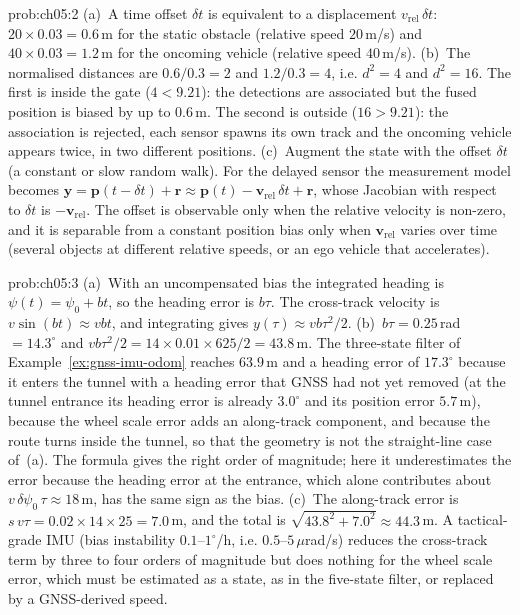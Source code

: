 \documentclass[graybox,envcountchap]{style/SNmono}
\begin{document}
\begin{sol}{prob:ch05:2}
(a)~A time offset $\delta t$ is equivalent to a displacement $v_{\mathrm{rel}}\,\delta t$: $20\times0.03=0.6$\,m for the static obstacle (relative speed $20$\,m/s) and $40\times0.03=1.2$\,m for the oncoming vehicle (relative speed $40$\,m/s). (b)~The normalised distances are $0.6/0.3=2$ and $1.2/0.3=4$, i.e. $d^{2}=4$ and $d^{2}=16$. The first is inside the gate ($4<9.21$): the detections are associated but the fused position is biased by up to $0.6$\,m. The second is outside ($16>9.21$): the association is rejected, each sensor spawns its own track and the oncoming vehicle appears twice, in two different positions. (c)~Augment the state with the offset $\delta t$ (a constant or slow random walk). For the delayed sensor the measurement model becomes $\mathbf{y}=\mathbf{p}(t-\delta t)+\mathbf{r}\approx\mathbf{p}(t)-\mathbf{v}_{\mathrm{rel}}\,\delta t+\mathbf{r}$, whose Jacobian with respect to $\delta t$ is $-\mathbf{v}_{\mathrm{rel}}$. The offset is observable only when the relative velocity is non-zero, and it is separable from a constant position bias only when $\mathbf{v}_{\mathrm{rel}}$ varies over time (several objects at different relative speeds, or an ego vehicle that accelerates).
\end{sol}

\begin{sol}{prob:ch05:3}
(a)~With an uncompensated bias the integrated heading is $\psi(t)=\psi_{0}+bt$, so the heading error is $b\tau$. The cross-track velocity is $v\sin(bt)\approx vbt$, and integrating gives $y(\tau)\approx vb\tau^{2}/2$. (b)~$b\tau=0.25$\,rad $=14.3^{\circ}$ and $vb\tau^{2}/2=14\times0.01\times625/2=43.8$\,m. The three-state filter of Example~\ref{ex:gnss-imu-odom} reaches $63.9$\,m and a heading error of $17.3^{\circ}$ because it enters the tunnel with a heading error that GNSS had not yet removed (at the tunnel entrance its heading error is already $3.0^{\circ}$ and its position error $5.7$\,m), because the wheel scale error adds an along-track component, and because the route turns inside the tunnel, so that the geometry is not the straight-line case of~(a). The formula gives the right order of magnitude; here it underestimates the error because the heading error at the entrance, which alone contributes about $v\,\delta\psi_{0}\,\tau\approx18$\,m, has the same sign as the bias. (c)~The along-track error is $s\,v\tau=0.02\times14\times25=7.0$\,m, and the total is $\sqrt{43.8^{2}+7.0^{2}}\approx44.3$\,m. A tactical-grade IMU (bias instability $0.1$--$1^{\circ}$/h, i.e. $0.5$--$5\,\mu$rad/s) reduces the cross-track term by three to four orders of magnitude but does nothing for the wheel scale error, which must be estimated as a state, as in the five-state filter, or replaced by a GNSS-derived speed.
\end{sol}
\end{document}
